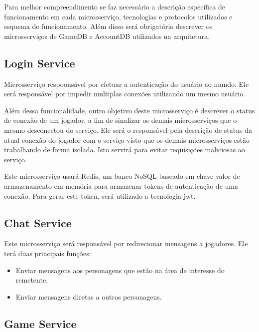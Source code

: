 Para melhor compreendimento se faz necessário a descrição específica de funcionamento em cada microsserviço, tecnologias e protocolos utilizados e esquema de funcionamento.
%
Além disso será obrigatório descrever os microsserviços de GameDB e AccountDB utilizados na arquitetura.

\subsection{Login Service}

Microsserviço respoonsável por efetuar a autenticação do usuário ao mundo.
%
Ele será responsável por impedir multiplas conexões utilizando um mesmo usuário.



Além dessa funcionalidade, outro objetivo deste microsserviço é descrever o status de conexão de um jogador, a fim de sinalizar os demais microsserviços que o mesmo desconectou do serviço.
%
Ele será o responsável pela descrição de status da atual conexão do jogador com o serviço visto que os demais microsserviços estão trabalhando de forma isolada.
%
Isto servirá para evitar requisições maliciosas ao serviço.



Este microsserviço usará Redis, um banco NoSQL baseado em chave-valor de armazenamento em memória para armazenar tokens de autenticação de uma conexão.
%
Para gerar este token, será utilizado a tecnologia \ac{jwt}.

\subsection{Chat Service}


Este microsserviço será responsável por redirecionar mensagens a jogadores.
%
Ele terá duas principais funções:

\begin{itemize}
  \item Enviar mensagens aos personagens que estão na área de interesse do remetente.
  \item Enviar mensagens diretas a outros personagens.
\end{itemize}


\subsection{Game Service}

